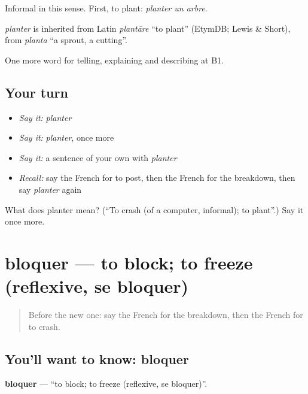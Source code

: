 Informal in this sense. First, to plant: \emph{planter un arbre}.

\begin{cousinweb}
\emph{planter} is inherited from Latin \emph{plantāre} \textquotedblleft{}to plant\textquotedblright{} (EtymDB; Lewis \& Short), from \emph{planta} \textquotedblleft{}a sprout, a cutting\textquotedblright{}.
\end{cousinweb}

\begin{grammarlens}[title={What you've built}]
One more word for telling, explaining and describing at B1.
\end{grammarlens}

\subsection*{Your turn}
\begin{itemize}
\raggedright
  \item \emph{Say it:} \emph{planter}
  \item \emph{Say it:} \emph{planter}, once more
  \item \emph{Say it:} a sentence of your own with \emph{planter}
  \item \emph{Recall:} say the French for to post, then the French for the breakdown, then say \emph{planter} again
\end{itemize}

\begin{tcolorbox}[breakable,colback=teal!4,colframe=teal!35!black,title={Before you move on}]
What does planter mean? (\textquotedblleft{}To crash (of a computer, informal); to plant\textquotedblright{}.) Say it once more.
\end{tcolorbox}
\section[bloquer]{bloquer — to block; to freeze (reflexive, se bloquer)}

\label{lesson:FR-C399-bloquer}



\begin{quote}
Before the new one: say the French for the breakdown, then the French for to crash.
\end{quote}

\subsection*{You'll want to know: bloquer}
\textbf{bloquer} — \textquotedblleft{}to block; to freeze (reflexive, se bloquer)\textquotedblright{}.

